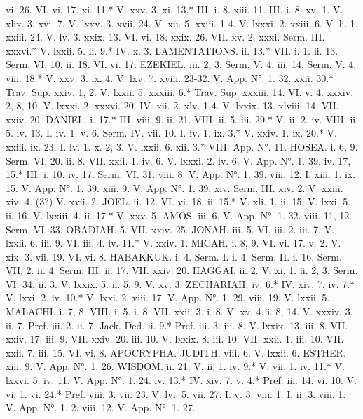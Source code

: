 vi. 26.	VI. vi. 17.
xi. 11.*	V. xxv. 3.
xi. 13.*	III. i. 8.
xiii. 11.	III. i. 8.
xv. 1.	V. xlix. 3.
xvi. 7.	V. lxxv. 3.
xvii. 24.	V. xii. 5.
xxiii. 1-4.	V. lxxxi. 2.
xxiii. 6.	V. li. 1.
xxiii. 24.	V. lv. 3.
xxix. 13.	VI. vi. 18.
xxix. 26.	VII. xv. 2.
xxxi.	Serm. III.
xxxvi.*	V. lxxii. 5.
li. 9.*	IV. x. 3.
LAMENTATIONS.
ii. 13.*	VII. i. 1.
ii. 13.	Serm. VI. 10.
ii. 18.	VI. vi. 17.
EZEKIEL.
iii. 2, 3.	Serm. V. 4.
iii. 14.	Serm. V. 4.
viii. 18.*	V. xxv. 3.
ix. 4.	V. lxv. 7.
xviii. 23-32.	V. App. N°. 1. 32.
xxii. 30.*	Trav. Sup.
xxiv. 1, 2.	V. lxxii. 5.
xxxiii. 6.*	Trav. Sup.
xxxiii. 14.	VI. v. 4.
xxxiv. 2, 8, 10.	V. lxxxi. 2.
xxxvi. 20.	IV. xii. 2.
xlv. 1-4.	V. lxxix. 13.
xlviii. 14.	VII. xxiv. 20.
DANIEL.
i. 17.*	III. viii. 9.
ii. 21.	VIII. ii. 5.
iii. 29.*	V. ii. 2.
iv.	VIII. ii. 5.
iv. 13.	I. iv. 1.
v. 6.	Serm. IV.
vii. 10.	I. iv. 1.
ix. 3.*	V. xxiv. 1.
ix. 20.*	V. xxiii.
ix. 23.	I. iv. 1.
x. 2, 3.	V. lxxii. 6.
xii. 3.*	VIII. App. N°. 11.
HOSEA.
i. 6, 9.	Serm. VI. 20.
ii. 8.	VII. xxii. 1.
iv. 6.	V. lxxxi. 2.
iv. 6.	V. App. N°. 1. 39.
iv. 17, 15.*	III. i. 10.
iv. 17.	Serm. VI. 31.
viii. 8.	V. App. N°. 1. 39.
viii. 12.	I. xiii. 1.
ix. 15.	V. App. N°. 1. 39.
xiii. 9.	V. App. N°. 1. 39.
xiv.	Serm. III.
xiv. 2.	V. xxiii.
xiv. 4. (3?)	V. xvii. 2.
JOEL.
ii. 12.	VI. vi. 18.
ii. 15.*	V. xli. 1.
ii. 15.	V. lxxi. 5.
ii. 16.	V. lxxiii. 4.
ii. 17.*	V. xxv. 5.
AMOS.
iii. 6.	V. App. N°. 1. 32.
viii. 11, 12.	Serm. VI. 33.
OBADIAH.
5.	VII. xxiv. 25.
JONAH.
iii. 5.	VI. iii. 2.
iii. 7.	V. lxxii. 6.
iii. 9.	VI. iii. 4.
iv. 11.*	V. xxiv. 1.
MICAH.
i. 8, 9.	VI. vi. 17.
v. 2.	V. xix. 3.
vii. 19.	VI. vi. 8.
HABAKKUK.
i. 4.	Serm. I.
i. 4.	Serm. II.
i. 16.	Serm. VII. 2.
ii. 4.	Serm. III.
ii. 17.	VII. xxiv. 20.
HAGGAI.
ii. 2.	V. xi. 1.
ii. 2, 3.	Serm. VI. 34.
ii. 3.	V. lxxix. 5.
ii. 5, 9.	V. xv. 3.
ZECHARIAH.
iv. 6.*	IV. xiv. 7.
iv. 7.*	V. lxxi. 2.
iv. 10.*	V. lxxi. 2.
viii. 17.	V. App. N°. 1. 29.
viii. 19.	V. lxxii. 5.
MALACHI.
i. 7, 8.	VIII. i. 5.
i. 8.	VII. xxii. 3.
i. 8.	V. xv. 4.
i. 8, 14.	V. xxxiv. 3.
ii. 7.	Pref. iii. 2.
ii. 7.	Jack. Ded.
ii. 9.*	Pref. iii. 3.
iii. 8.	V. lxxix. 13.
iii. 8.	VII. xxiv. 17.
iii. 9.	VII. xxiv. 20.
iii. 10.	V. lxxix. 8.
iii. 10.	VII. xxii. 1.
iii. 10.	VII. xxii. 7.
iii. 15.	VI. vi. 8.
APOCRYPHA.
JUDITH.
viii. 6.	V. lxxii. 6.
ESTHER.
xiii. 9.	V. App. N°. 1. 26.
WISDOM.
ii. 21.	V. ii. 1.
iv. 9.*	V. vii. 1.
iv. 11.*	V. lxxvi. 5.
iv. 11.	V. App. N°. 1. 24.
iv. 13.*	IV. xiv. 7.
v. 4.*	Pref. iii. 14.
vi. 10.	V. vi. 1.
vi. 24.*	Pref. viii. 3.
vii. 23.	V. lvi. 5.
vii. 27.	I. v. 3.
viii. 1.	I. ii. 3.
viii. 1.	V. App. N°. 1. 2.
viii. 12.	V. App. N°. 1. 27.
